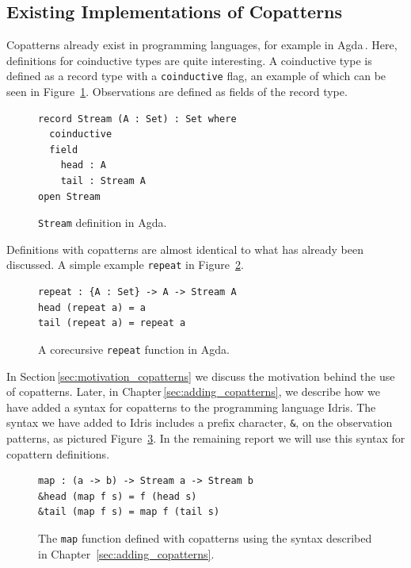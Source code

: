 \subsection{Existing Implementations of Copatterns}
Copatterns already exist in programming languages, for example in
Agda\,\cite{Norell:thesis}. Here, definitions for coinductive types are quite
interesting. A coinductive type is defined as a record type with a
\texttt{coinductive} flag, an example of which can be seen in
Figure~\ref{fig:agda_stream}. Observations are defined as fields of the record
type.

\begin{figure}[h]
\begin{lstlisting}[mathescape]
record Stream (A : Set) : Set where
  coinductive
  field
    head : A
    tail : Stream A
open Stream
\end{lstlisting}
\caption{\texttt{Stream} definition in Agda.}
\label{fig:agda_stream}
\end{figure}

Definitions with copatterns are almost identical to what has already been
discussed. A simple example \texttt{repeat} in Figure~\ref{fig:agda_repeat}. 

\begin{figure}[h]
\begin{lstlisting}[mathescape]
repeat : {A : Set} -> A -> Stream A
head (repeat a) = a
tail (repeat a) = repeat a 
\end{lstlisting}
\caption{A corecursive \texttt{repeat} function in Agda.}
\label{fig:agda_repeat}
\end{figure}

In Section\,\ref{sec:motivation_copatterns} we discuss the motivation behind the
use of copatterns. Later, in Chapter\,\ref{sec:adding_copatterns}, we describe
how we have added a syntax for copatterns to the programming language Idris. The
syntax we have added to Idris includes a prefix character, \texttt{\&}, on the
observation patterns, as pictured
Figure~\ref{fig:map_copat_syntax}. In the remaining report we will use this
syntax for copattern definitions.

\begin{figure}[h]
\begin{lstlisting}[mathescape]
map : (a -> b) -> Stream a -> Stream b
&head (map f s) = f (head s)
&tail (map f s) = map f (tail s)
\end{lstlisting}
\caption{The \texttt{map} function defined with copatterns using the syntax
  described in Chapter~\ref{sec:adding_copatterns}.}
\label{fig:map_copat_syntax}
\end{figure}

